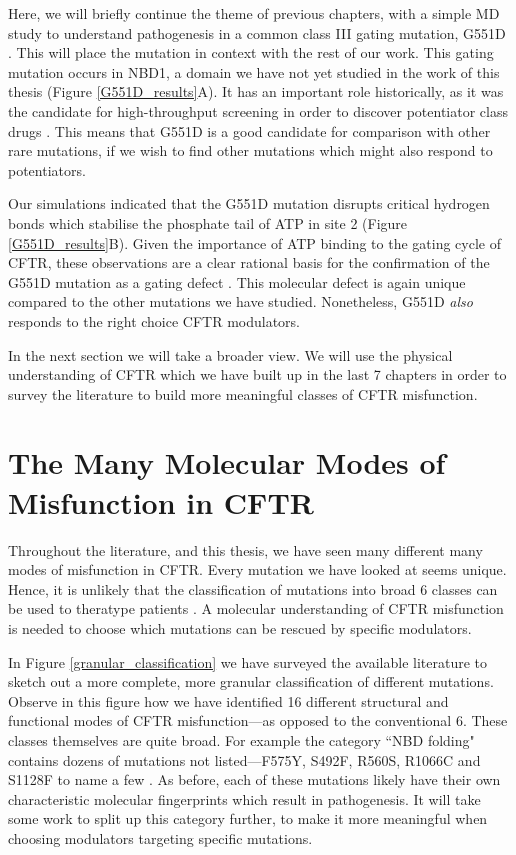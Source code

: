Here, we will briefly continue the theme of previous chapters, with a simple MD study to understand pathogenesis in a common class III gating mutation, G551D \cite{li1996}. This will place the mutation in context with the rest of our work. This gating mutation occurs in NBD1, a domain we have not yet studied in the work of this thesis (Figure \ref{G551D_results}A). It has an important role historically, as it was the candidate for high-throughput screening in order to discover potentiator class drugs \cite{vangoor2009}. This means that G551D is a good candidate for comparison with other rare mutations, if we wish to find other mutations which might also respond to potentiators.

Our simulations indicated that the G551D mutation disrupts critical hydrogen bonds which stabilise the phosphate tail of ATP in site 2 (Figure \ref{G551D_results}B). Given the importance of ATP binding to the gating cycle of CFTR, these observations are a clear rational basis for the confirmation of the G551D mutation as a gating defect \cite{bompadre2008}. This molecular defect is again unique compared to the other mutations we have studied. Nonetheless, G551D \textit{also} responds to the right choice CFTR modulators. 

In the next section we will take a broader view. We will use the physical understanding of CFTR which we have built up in the last 7 chapters in order to survey the literature to build more meaningful classes of CFTR misfunction.

\section{The Many Molecular Modes of Misfunction in CFTR}

Throughout the literature, and this thesis, we have seen many different many modes of  misfunction in CFTR. Every mutation we have looked at seems unique. Hence, it is unlikely that the classification of mutations into broad 6 classes can be used to theratype patients \cite{veit2016}. A molecular understanding of CFTR misfunction is needed to choose which mutations can be rescued by specific modulators. 

In Figure \ref{granular_classification} we have surveyed the available literature to sketch out a more complete, more granular classification of different mutations. Observe in this figure how we have identified 16 different structural and functional modes of CFTR misfunction---as opposed to the conventional 6. These classes themselves are quite broad. For example the category ``NBD folding" contains dozens of mutations not listed---F575Y, S492F, R560S, R1066C and S1128F to name a few \cite{awatade2019, lopes-pacheco2016, casals1997, cotten1996, penmatsa2009}. As before, each of these mutations likely have their own characteristic molecular fingerprints which result in pathogenesis. It will take some work to split up this category further, to make it more meaningful when choosing modulators targeting specific mutations.

